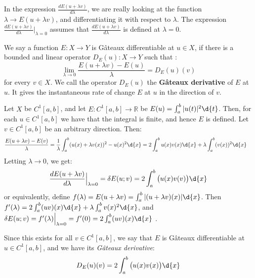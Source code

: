 \documentclass{article}
\begin{document}
\begin{remark} In the expression $\frac{d E(u + \lambda v)}{d \lambda}$, we are really looking at the function $\lambda \to E(u+ \lambda v)$, and differentiating it with respect to $\lambda$. The expression $\frac{d E(u+\lambda v)}{d \lambda} \Big|_{\lambda = 0}$ assumes that $\frac{d E(u + \lambda v)}{d \lambda}$ is defined at $\lambda = 0$. 

\end{remark}

\begin{theorem}
\end{theorem}

\begin{definition}  We say a function $E: X \to Y$ is Gâteaux differentiable at $u \in X$, if there is a bounded and linear operator $D_{E}(u) : X \to Y$ such that :
\[
  \lim_{\lambda \to 0} \frac{ E(u+ \lambda v) - E(u) }{\lambda} = D_{E}(u)(v)
\]
for every $v \in X$. We call the operator $D_{E}(u)$ the \textbf{Gâteaux derivative} of $E$ at $u$. It gives the instantaneous rate of change $E$ at $u$ in the direction of $v$. 
\end{definition}


\begin{example} Let $X$ be $C^{1}[a,b]$, and let $E: C^{1}[a,b] \to \mathbb{R}$ be  $E(u) = \int_{a}^{b} |u(t)| ^2 \d{t}$. Then, for each $u \in C^{1}[a,b]$ we have that the integral is finite, and hence $E$ is defined. Let $v \in C^{1}[a,b]$ be an arbitrary direction. Then:
\begin{align*}
 \frac{E(u+\lambda v)-E(v)}{\lambda} &= \frac{1}{\lambda} \int_{a}^{b}  (u(x) +\lambda v(x) ) ^2 - u(x) ^2 \d{x}  = 2 \int_{a}^{b} u(x) v(x) \d{x} + \lambda \int_{a}^{b} (v(x)) ^2 \d{x} 
\end{align*}
Letting $\lambda \to 0$,  we get:
\[
  \frac{d E(u+\lambda v)}{d \lambda} \Big|_{\lambda = 0} = \delta E(u ; v) =  2 \int_{a}^{b} \big( u(x) v(v) \big) \d{x}
\]
  or equivalently, define $f(\lambda) = E(u + \lambda v) = \int_{a}^{b} | (u + \lambda v)(x) |  \d{x}$. Then $f'(\lambda) = 2 \int_{a}^{b} (u v)(x) \d{x} + \lambda \int_{a}^{b} v(x) ^2 \d{x}$, and $\delta E(u ; v) = f'( \lambda) \Big|_{\lambda = 0} = f'(0) = 2 \int_{a}^{b} (uv) (x) \d{x}$ .

Since this exists for all $v \in C^{1}[a,b]$, we say that $E$ is Gâteaux differentiable at $u \in C^{1}[a,b]$, and we have its \textit{Gâteaux derivative}:
\[
  D_{E}(u) (v) = 2 \int_{a}^{b} \big( u(x) v(x)  \big) \d{x}
\]
\end{example}
\end{document}
